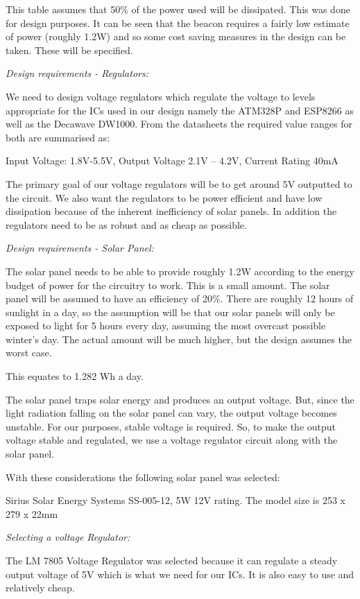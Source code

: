 This table assumes that 50\% of the power used will be dissipated. This was done for design
purposes. It can be seen that the beacon requires a fairly low estimate of power (roughly 1.2W) and
so some cost saving measures in the design can be taken. These will be specified.

\textit{Design requirements - Regulators:}

We need to design voltage regulators which regulate the voltage to levels appropriate for the ICs
used in our design namely the ATM328P and ESP8266 as well as the Decawave DW1000.
From the datasheets the required value ranges for both are summarised as:

Input Voltage: 1.8V-5.5V, Output Voltage 2.1V – 4.2V, Current Rating 40mA

The primary goal of our voltage regulators will be to get around 5V outputted to the circuit.
We also want the regulators to be power efficient and have low dissipation because of the inherent
inefficiency of solar panels. In addition the regulators need to be as robust and as cheap as possible.

\textit{Design requirements - Solar Panel:}

The solar panel needs to be able to provide roughly 1.2W according to the energy budget of power
for the circuitry to work. This is a small amount. The solar panel will be assumed to have an
efficiency of 20\%. There are roughly 12 hours of sunlight in a day, so the assumption will be that our
solar panels will only be exposed to light for 5 hours every day, assuming the most overcast possible
winter's day. The actual amount will be much higher, but the design assumes the worst case.

This equates to 1.282 Wh a day.

The solar panel traps solar energy and produces an output voltage. But, since the light radiation
falling on the solar panel can vary, the output voltage becomes unstable. For our purposes, stable
voltage is required. So, to make the output voltage stable and regulated, we use a voltage regulator
circuit along with the solar panel.

With these considerations the following solar panel was selected:

Sirius Solar Energy Systems SS-005-12, 5W 12V rating. The model size is 253 x 279 x 22mm

\textit{Selecting a voltage Regulator:}

The LM 7805 Voltage Regulator was selected because it can regulate a steady output voltage of 5V
which is what we need for our ICs. It is also easy to use and relatively cheap.

